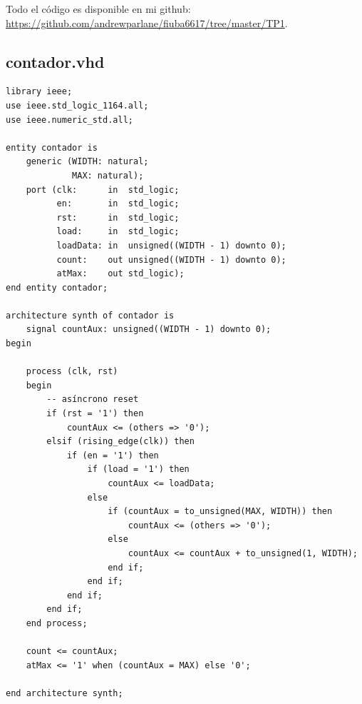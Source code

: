 \documentclass[a4paper]{article}
\begin{document}
Todo el código es disponible en mi github: \url{https://github.com/andrewparlane/fiuba6617/tree/master/TP1}.

\subsection{contador.vhd}
\begin{verbatim}
library ieee;
use ieee.std_logic_1164.all;
use ieee.numeric_std.all;

entity contador is
    generic (WIDTH: natural;
             MAX: natural);
    port (clk:      in  std_logic;
          en:       in  std_logic;
          rst:      in  std_logic;
          load:     in  std_logic;
          loadData: in  unsigned((WIDTH - 1) downto 0);
          count:    out unsigned((WIDTH - 1) downto 0);
          atMax:    out std_logic);
end entity contador;

architecture synth of contador is
    signal countAux: unsigned((WIDTH - 1) downto 0);
begin

    process (clk, rst)
    begin
        -- asíncrono reset
        if (rst = '1') then
            countAux <= (others => '0');
        elsif (rising_edge(clk)) then
            if (en = '1') then
                if (load = '1') then
                    countAux <= loadData;
                else
                    if (countAux = to_unsigned(MAX, WIDTH)) then
                        countAux <= (others => '0');
                    else
                        countAux <= countAux + to_unsigned(1, WIDTH);
                    end if;
                end if;
            end if;
        end if;
    end process;

    count <= countAux;
    atMax <= '1' when (countAux = MAX) else '0';

end architecture synth;
\end{verbatim}
\end{document}
